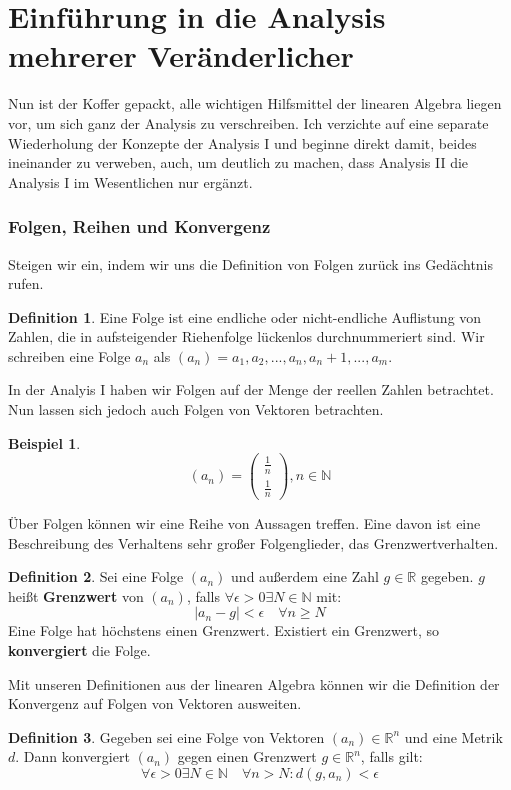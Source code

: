 \documentclass[11pt,a4paper]{scrartcl}
\theoremstyle{remark}
\theoremstyle{definition}
\newtheorem{definition}{Definition}[section]
\newtheorem{example}{Beispiel}[section]
\begin{document}
\part{Einführung in die Analysis mehrerer Veränderlicher}
Nun ist der Koffer gepackt, alle wichtigen Hilfsmittel der linearen Algebra liegen vor, um sich ganz der Analysis zu verschreiben. Ich verzichte auf eine separate Wiederholung der Konzepte der Analysis I und beginne direkt damit, beides ineinander zu verweben, auch, um deutlich zu machen, dass Analysis II die Analysis I im Wesentlichen nur ergänzt.
\section{Folgen, Reihen und Konvergenz}
Steigen wir ein, indem wir uns die Definition von Folgen zurück ins Gedächtnis rufen.
\begin{definition}
Eine Folge ist eine endliche oder nicht-endliche Auflistung von Zahlen, die in aufsteigender Riehenfolge lückenlos durchnummeriert sind. Wir schreiben eine Folge $a_n$ als $(a_{n}) = a_1, a_2, ..., a_n, a_n+1, ..., a_m$.
\end{definition}
In der Analyis I haben wir Folgen auf der Menge der reellen Zahlen betrachtet. Nun lassen sich jedoch auch Folgen von Vektoren betrachten.
\begin{example}
\[(a_n) = \left( \begin{matrix}\frac{1}{n} \\ \frac{1}{n}\end{matrix}\right), n \in \mathbb{N}\]
\end{example}
Über Folgen können wir eine Reihe von Aussagen treffen. Eine davon ist eine Beschreibung des Verhaltens sehr großer Folgenglieder, das Grenzwertverhalten.
\begin{definition}
Sei eine Folge $(a_n)$ und außerdem eine Zahl $g \in \mathbb{R}$ gegeben. $g$ heißt \textbf{Grenzwert} von $(a_n)$, falls $\forall \epsilon > 0 \exists N \in \mathbb{N}$ mit:
\[\vert a_n - g \vert < \epsilon \quad \forall n \geq N\]
Eine Folge hat höchstens einen Grenzwert. Existiert ein Grenzwert, so \textbf{konvergiert} die Folge.
\end{definition}
Mit unseren Definitionen aus der linearen Algebra können wir die Definition der Konvergenz auf Folgen von Vektoren ausweiten.
\begin{definition}
Gegeben sei eine Folge von Vektoren $(a_n) \in \mathbb{R}^{n}$ und eine Metrik $d$. Dann konvergiert $(a_n)$ gegen einen Grenzwert $g \in \mathbb{R}^{n}$, falls gilt: 
\[\forall \epsilon > 0 \exists N \in \mathbb{N} \quad \forall n > N: d(g, a_n) < \epsilon\]
\end{definition}
\end{document}
